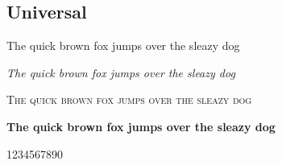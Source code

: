 \documentclass[a4paper]{article}
\newcommand{\frase}{The quick brown fox jumps over the sleazy dog}
\begin{document}
\subsection*{Universal}

\frase

\emph{\frase}

\textsc{\frase}

\textbf{\frase}

1234567890
\end{document}
